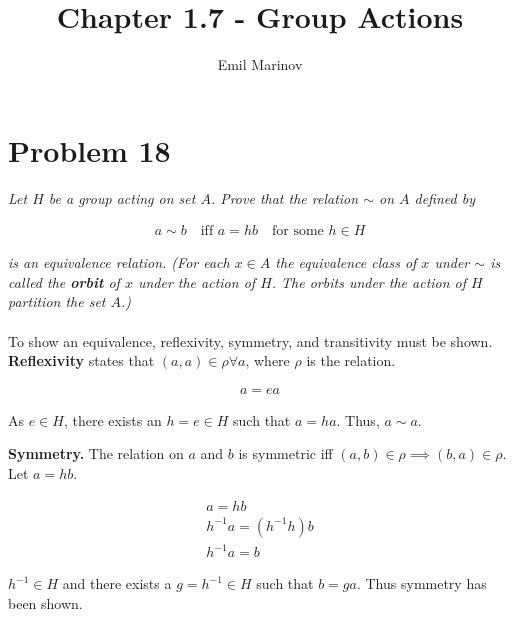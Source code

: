 \documentclass[12pt,letterpaper]{article}
\begin{document}
\title{Chapter 1.7 - Group Actions}
\author{Emil Marinov}
\maketitle

\section{Problem 18}

\textit{Let $H$ be a group acting on set $A$.  Prove that the relation $\sim$ on $A$ defined by}

\begin{equation}
   \begin{aligned}
      a \sim b \quad \text{iff } a=hb \quad \text{for some } h \in H
   \end{aligned}
\end{equation}

\textit{is an equivalence relation.
(For each $x \in A$ the equivalence class of $x$ under $\sim$ is called the \textbf{orbit} of $x$ under 
the action of $H$.
The orbits under the action of $H$ partition the set $A$.)} \\
\\
To show an equivalence, reflexivity, symmetry, and transitivity must be shown. \\
\textbf{Reflexivity} states that $(a, a) \in \rho \forall a$, where $\rho$ is the relation.

\begin{equation}
   \begin{aligned}
      a = ea
   \end{aligned}
\end{equation}

As $e \in H$, there exists an $h = e \in H$ such that $a = ha$.  Thus, $a \sim a$.

\textbf{Symmetry.} The relation on $a$ and $b$ is symmetric iff $(a,b) \in \rho \implies (b,a) \in \rho$.
Let $a = hb$.

\begin{equation}
   \begin{aligned}
      a = hb \\
      h^{-1} a = (h^{-1} h)b \\
      h^{-1} a = b
   \end{aligned}
\end{equation}

$h^{-1} \in H$ and there exists a $g = h^{-1} \in H$ such that $b = ga$.
Thus symmetry has been shown.
\end{document}
